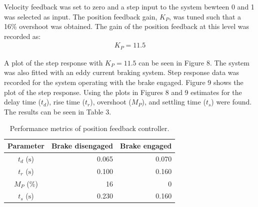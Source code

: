 \documentclass{article}
\begin{document}
Velocity feedback was set to zero and a step input to the system bewteen 0 and 1 was selected as input. The position feedback gain, $K_P$, was tuned such that a 16\% overshoot was obtained. The gain of the position feedback at this level was recorded as:
\begin{align*}
	K_P = 11.5
\end{align*}

A plot of the step response with $K_P = 11.5$ can be seen in Figure 8. The system was also fitted with an eddy current braking system. Step response data was recorded for the system operating with the brake engaged. Figure 9 shows the plot of the step response. Using the plots in Figures 8 and 9 estimates for the delay time ($t_d$), rise time ($t_r$), overshoot ($M_P$), and settling time ($t_s$) were found. The results can be seen in Table 3.
\vspace{0.5cm}
\begin{table}[H]
	\centering
	\caption{Performance metrics of position feedback controller.}
	\begin{tabular}{crr}
		\toprule
		\textbf{Parameter} & \textbf{Brake disengaged} & \textbf{Brake engaged}\\
		\midrule
		$t_d$ ($\si{\second}$) & 0.065 & 0.070\\
		$t_r$ ($\si{\second}$) & 0.100 & 0.160\\
		$M_P$ (\%) & 16 & 0\\
		$t_s$ ($\si{\second}$) & 0.230 & 0.160\\
		\bottomrule
	\end{tabular}
\end{table}
\end{document}
